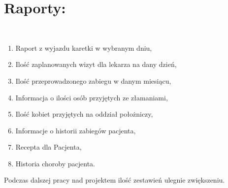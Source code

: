 \section*{Raporty:}\\
\begin{enumerate}
\itemsep-5pt
\item Raport z wyjazdu karetki w wybranym dniu,
\item Ilość zaplanowanych wizyt dla lekarza na dany dzień,
\item Ilość przeprowadzonego zabiegu w danym miesiącu,
\item Informacja o ilości osób przyjętych ze złamaniami,
\item Ilość kobiet przyjętych na oddział położniczy,
\item Informacje o historii zabiegów pacjenta,
\item Recepta dla Pacjenta,
\item Historia choroby pacjenta.

\end{enumerate}
Podczas dalszej pracy nad projektem ilość zestawień ulegnie zwiększeniu.